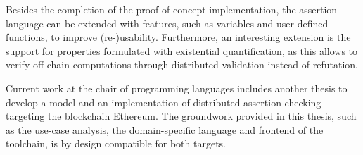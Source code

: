 Besides the completion of the proof-of-concept implementation, the assertion language can be extended with features, such as variables and user-defined functions, to improve (re-)usability. Furthermore, an interesting extension is the support for properties formulated with existential quantification, as this allows to verify off-chain computations through distributed validation instead of refutation. 

Current work at the chair of programming languages includes another thesis to develop a model and an implementation of distributed assertion checking targeting the blockchain Ethereum. The groundwork provided in this thesis, such as the use-case analysis, the domain-specific language and frontend of the toolchain, is by design compatible for both targets.